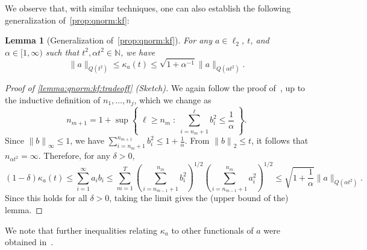 \documentclass[11pt]{article}
\newtheorem{lemma}[lem]{Lemma}
\theoremstyle{remark}   	\newtheorem{remark}[theorem]{Remark}
\theoremstyle{definition}   	\newaliascnt{defn}{theorem}
\newenvironment{proofof}[1]{\begin{proof}[Proof of {#1}]}{\end{proof}}
\newcommand{\setOfSuchThat}[2]{ \left\{\; #1 \;\colon\; #2\; \right\} } 			\newcommand{\indicSet}[1]{\mathds{1}_{#1}}                                              \newcommand{\indic}[1]{\indicSet{\left\{#1\right\}}}                                             \newcommand{\disjunion}{\amalg}
\newcommand{\norm}[1]{\lVert#1{\rVert}}
\newcommand{\normtwo}[1]{{\norm{#1}}_2}
\newcommand{\norminf}[1]{{\norm{#1}}_\infty}
\newcommand{\N}{\ensuremath{\mathbb{N}}\xspace}
\newcommand{\lp}[1][1]{\ell_{#1}}
\newcommand{\kf}[1]{\kappa_{#1}}
\begin{document}
We observe that, with similar techniques, one can also establish the following generalization of~\autoref{prop:qnorm:kf}:
\begin{lemma}[{Generalization of~\autoref{prop:qnorm:kf}}]\label{lemma:qnorm:kf:tradeoff}
  For any $a\in\lp[2]$, $t$, and $\alpha\in[1,\infty)$ such that $t^2, \alpha t^2\in\N$, we have
  \begin{equation}\label{eq:qnorm:kf:tradeoff}
    \norm{a}_{Q(t^2)} \leq \kf{a}(t) \leq \sqrt{1+\alpha^{-1}}\norm{a}_{Q(\alpha t^2)}.
  \end{equation}
\end{lemma}
\begin{proofof}{\autoref{lemma:qnorm:kf:tradeoff} (Sketch)}
  We again follow the proof of~\cite[Lemma 2.2]{Astashkin:2010}, up to the inductive definition of $n_1,\dots,n_j$, which we change as
  \[
      n_{m+1} = 1 + \sup\setOfSuchThat{ \ell \geq n_m }{ \sum_{i=n_m+1}^\ell b_i^2 \leq \frac{1}{\alpha}  }.
  \]
  Since $\norminf{b}\leq 1$, we have $\sum_{i=n_m+1}^{n_{m+1}} b_i^2 \leq 1+\frac{1}{\alpha}$. From $\normtwo{b}\leq t$, it follows that $n_{\alpha t^2} = \infty$. Therefore, for any $\delta >0$,
  \[
      (1-\delta)\kf{a}(t) \leq \sum_{i=1}^\infty a_ib_i \leq \sum_{m=1}^{T} \left(\sum_{i=n_{m-1}+1}^{n_{m}} b_i^2\right)^{1/2}\left(\sum_{i=n_{m-1}+1}^{n_{m}} a_i^2\right)^{1/2}
      \leq \sqrt{1+\frac{1}{\alpha}} \norm{a}_{Q(\alpha t^2)}.
  \]
  Since this holds for all $\delta>0$, taking the limit gives the (upper bound of the) lemma.
\end{proofof}

We note that further inequalities relating $\kf{a}$ to other functionals of $a$ were obtained in~\cite{HK:94}.
\end{document}
